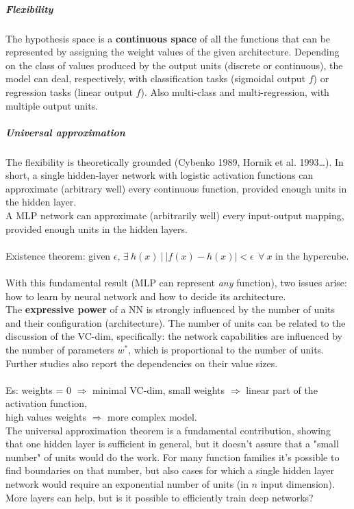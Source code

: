 \documentclass[10pt]{report}
\begin{document}
\subparagraph{Flexibility} The hypothesis space is a \textbf{continuous space} of all the functions that can be represented by assigning the weight values of the given architecture. Depending on the class of values produced by the output units (discrete or continuous), the model can deal, respectively, with classification tasks (sigmoidal output $f$) or regression tasks (linear output $f$). Also multi-class and multi-regression, with multiple output units.
\subparagraph{Universal approximation} The flexibility is theoretically grounded (Cybenko 1989, Hornik et al. 1993\ldots). In short, a single hidden-layer network with logistic activation functions can approximate (arbitrary well) every continuous function, provided enough units in the hidden layer.\\
A MLP network can approximate (arbitrarily well) every input-output mapping, provided enough units in the hidden layers.\\\\
Existence theorem: given $\epsilon$, $\exists\:h(x)\:|\:|f(x) - h(x)|< \epsilon\:\:\forall\:x$ in the hypercube.\\\\
With this fundamental result (MLP can represent \textit{any} function), two issues arise: how to learn by neural network and how to decide its architecture.\\
The \textbf{expressive power} of a NN is strongly influenced by the number of units and their configuration (architecture). The number of units can be related to the discussion of the VC-dim, specifically: the network capabilities are influenced by the number of parameters $w^*$, which is proportional to the number of units. Further studies also report the dependencies on their value sizes.\\\\
Es: weights = 0 $\Rightarrow$ minimal VC-dim, small weights $\Rightarrow$ linear part of the activation function,\\high values weights $\Rightarrow$ more complex model.\\
The universal approximation theorem is a fundamental contribution, showing that one hidden layer is sufficient in general, but it doesn't assure that a "small number" of units would do the work. For many function families it's possible to find boundaries on that number, but also cases for which a single hidden layer network would require an exponential number of units (in $n$ input dimension).\\
More layers can help, but is it possible to efficiently train deep networks?
\end{document}
